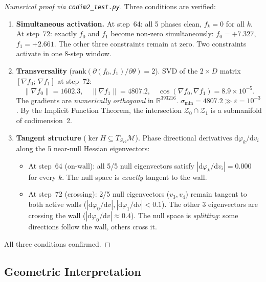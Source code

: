 \documentclass[11pt]{amsart}
\begin{document}
\begin{proof}[Numerical proof via \texttt{codim2\_test.py}]
Three conditions are verified:
\begin{enumerate}
\item \textbf{Simultaneous activation.}
  At step~64: all 5 phases clean, $f_k = 0$ for all $k$.
  At step~72: exactly $f_0$ and $f_1$ become non-zero simultaneously:
  $f_0 = +7.327$, $f_1 = +2.661$.
  The other three constraints remain at zero.
  Two constraints activate in one 8-step window.

\item \textbf{Transversality} ($\mathrm{rank}(\partial(f_0,f_1)/\partial\theta) = 2$).
  SVD of the $2 \times D$ matrix $[\nabla f_0;\, \nabla f_1]$ at step~72:
  \[
    \|\nabla f_0\| = 1602.3, \quad
    \|\nabla f_1\| = 4807.2, \quad
    \cos(\nabla f_0, \nabla f_1) = 8.9 \times 10^{-5}.
  \]
  The gradients are \emph{numerically orthogonal} in $\mathbb{R}^{393216}$.
  $\sigma_\mathrm{min} = 4807.2 \gg \varepsilon = 10^{-3}$.
  By the Implicit Function Theorem, the intersection
  $\mathcal{Z}_0 \cap \mathcal{Z}_1$ is a submanifold of codimension~2.

\item \textbf{Tangent structure} ($\ker H \subseteq T_{S_{72}}\mathcal{M}$).
  Phase directional derivatives $\mathrm{d}\varphi_k/\mathrm{d}v_i$
  along the 5 near-null Hessian eigenvectors:
  \begin{itemize}
  \item At step~64 (on-wall): all 5/5 null eigenvectors satisfy
    $|\mathrm{d}\varphi_k/\mathrm{d}v_i| = 0.000$ for every $k$.
    The null space is \emph{exactly} tangent to the wall.
  \item At step~72 (crossing): 2/5 null eigenvectors ($v_3, v_4$)
    remain tangent to both active walls ($|\mathrm{d}\varphi_0/\mathrm{d}v|,
    |\mathrm{d}\varphi_1/\mathrm{d}v| < 0.1$).
    The other 3 eigenvectors are crossing the wall
    ($|\mathrm{d}\varphi_0/\mathrm{d}v| \approx 0.4$).
    The null space is \emph{splitting}: some directions follow the wall,
    others cross it.
  \end{itemize}
\end{enumerate}
All three conditions confirmed.
\end{proof}

\subsection{Geometric Interpretation}
\end{document}
